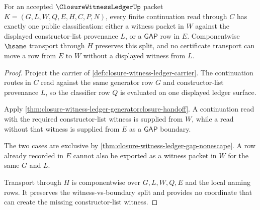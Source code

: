 \begin{theorem}
\label{thm:closure-witness-ledger-continuation-witness-exactness}
For an accepted $\ClosureWitnessLedgerUp$ packet $K=(G,L,W,Q,E,H,C,P,N)$, every finite continuation read through $C$ has exactly one public classification: either a witness packet in $W$ against the displayed constructor-list provenance $L$, or a $\mathsf{GAP}$ row in $E$. Componentwise $\hsame$ transport through $H$ preserves this split, and no certificate transport can move a row from $E$ to $W$ without a displayed witness from $L$.
\end{theorem}
\begin{proof}
Project the carrier of \autoref{def:closure-witness-ledger-carrier}. The continuation routes in $C$ read against the same generator row $G$ and constructor-list provenance $L$, so the classifier row $Q$ is evaluated on one displayed ledger surface.

Apply \autoref{thm:closure-witness-ledger-generatorclosure-handoff}. A continuation read with the required constructor-list witness is supplied from $W$, while a read without that witness is supplied from $E$ as a $\mathsf{GAP}$ boundary.

The two cases are exclusive by \autoref{thm:closure-witness-ledger-gap-nonescape}. A row already recorded in $E$ cannot also be exported as a witness packet in $W$ for the same $G$ and $L$.

Transport through $H$ is componentwise over $G,L,W,Q,E$ and the local naming rows. It preserves the witness-vs-boundary split and provides no coordinate that can create the missing constructor-list witness.
\end{proof}


\begin{closurestatus}{\ClosureWitnessLedgerUp}
  \theoryclosure{\seedClosure}
  \formalstatus{\unformalizedV}
\end{closurestatus}
